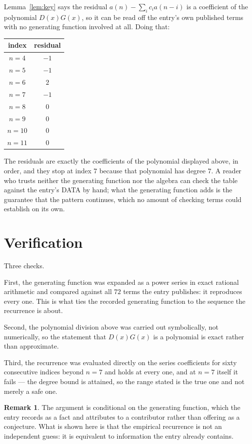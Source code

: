 \documentclass[11pt,a4paper]{article}
\theoremstyle{plain}
\theoremstyle{definition}
\newtheorem{remark}[theorem]{Remark}
\begin{document}
Lemma~\ref{lem:key} says the residual $a(n)-\sum_ic_ia(n-i)$ is a coefficient of the
polynomial $D(x)G(x)$, so it can be read off the entry's own published terms with no
generating function involved at all. Doing that:
\begin{center}
\begin{tabular}{cc}
index & residual \\ \hline
$n=4$ & $-1$ \\
$n=5$ & $-1$ \\
$n=6$ & $2$ \\
$n=7$ & $-1$ \\
$n=8$ & $0$ \\
$n=9$ & $0$ \\
$n=10$ & $0$ \\
$n=11$ & $0$
\end{tabular}
\end{center}
The residuals are exactly the coefficients of the polynomial displayed above, in order, and
they stop at index $7$ because that polynomial has degree $7$. A reader who trusts
neither the generating function nor the algebra can check the table against the entry's DATA
by hand; what the generating function adds is the guarantee that the pattern continues, which
no amount of checking terms could establish on its own.

\section{Verification}

Three checks.

First, the generating function was expanded as a power series in exact rational arithmetic and
compared against all $72$ terms the entry publishes: it reproduces every one. This is
what ties the recorded generating function to the sequence the recurrence is about.

Second, the polynomial division above was carried out symbolically, not numerically, so the
statement that $D(x)G(x)$ is a polynomial is exact rather than approximate.

Third, the recurrence was evaluated directly on the series coefficients for sixty consecutive
indices beyond $n=7$ and holds at every one, and at $n=7$ itself it fails --- the
degree bound is attained, so the range stated is the true one and not merely a safe one.

\begin{remark}
The argument is conditional on the generating function, which the entry records as a fact and
attributes to a contributor rather than offering as a conjecture. What is shown here is that
the empirical recurrence is not an independent guess: it is equivalent to information the
entry already contains.
\end{remark}
\end{document}
